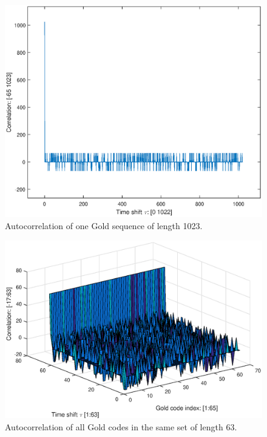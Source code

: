 \begin{figure}
	\centering
	\includegraphics[width=\textwidth]{chapters/cdma-chapters/autocorr-gold.eps}
	\caption{Autocorrelation of one Gold sequence of length 1023.}
	\label{fig:autocorr-gold}
\end{figure}


\begin{figure}
	\centering
	\includegraphics[width=\textwidth]{chapters/cdma-chapters/autocorr-gold-3d.eps}
	\caption{Autocorrelation of all Gold codes in the same set of length 63.}
	\label{fig:autocorr-gold-3d}
\end{figure}




